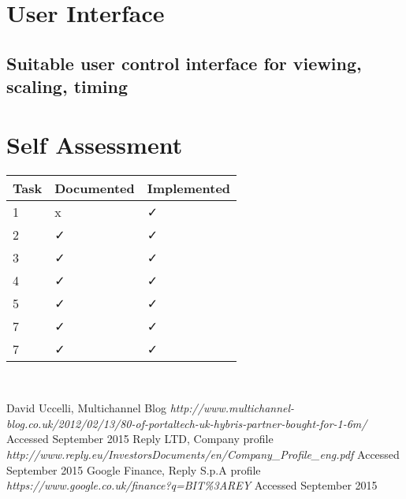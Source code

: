 \documentclass[titlepage]{article}
\begin{document}
\section{User Interface}
\subsection{Suitable user control interface for viewing, scaling, timing}
\section{Self Assessment}

 \begin{tabularx}{0.8\columnwidth}{| X | X | X |}
            \hline
            Task & Documented & Implemented \\
            \hline
            1 & x & ✓ \\
            \hline
            2 & ✓ & ✓ \\
            \hline
            3 & ✓ & ✓ \\
            \hline
            4 & ✓ & ✓ \\
            \hline
            5 & ✓ & ✓ \\
            \hline
            7 & ✓ & ✓ \\
            \hline
            7 & ✓ & ✓ \\
            \hline
        \end{tabularx} \\



 \begin{thebibliography}{1}
 	
 	 David Uccelli, Multichannel Blog {\em http://www.multichannel-blog.co.uk/2012/02/13/80-of-portaltech-uk-hybris-partner-bought-for-1-6m/} Accessed September 2015
 	 Reply LTD, Company profile {\em http://www.reply.eu/InvestorsDocuments/en/Company\_Profile\_eng.pdf} Accessed September 2015
 	 Google Finance, Reply S.p.A profile {\em https://www.google.co.uk/finance?q=BIT\%3AREY} Accessed September 2015
 	
 	
 	
 	
 		

	


 \end{thebibliography}
\end{document}
